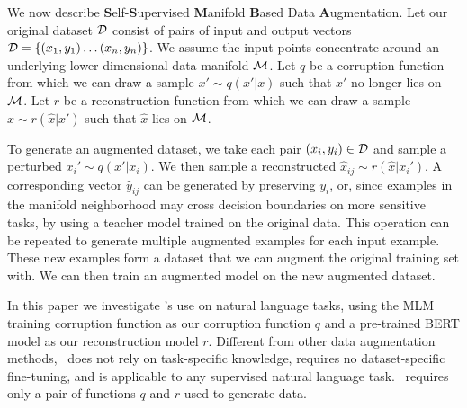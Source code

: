 \noindent We now describe \textbf{S}elf-\textbf{S}upervised \textbf{M}anifold \textbf{B}ased Data \textbf{A}ugmentation. 
Let our original dataset $\mathcal{D}$ consist of pairs of input and output vectors $\mathcal{D} = \{(x_1, y_1)\ldots(x_n, y_n)\}$.
We assume the input points concentrate around an underlying lower dimensional data manifold $\mathcal{M}$.
Let $q$ be a corruption function from which we can draw a sample $x' \sim q(x'|x)$ such that $x'$ no longer lies on $\mathcal{M}$.
Let $r$ be a reconstruction function from which we can draw a sample $\hat{x} \sim r(\hat{x}|x')$ such that $\hat{x}$ lies on $\mathcal{M}$. 

To generate an augmented dataset, we take
each pair $(x_i, y_i)\in\mathcal{D}$ and sample a perturbed $x_i' \sim q(x'|x_i)$.
We then sample a reconstructed $\hat{x}_{ij} \sim r(\hat{x}|x_i')$.
A corresponding vector $\hat{y}_{ij}$ can be generated by preserving $y_i$, or, 
since examples in the manifold neighborhood may cross decision boundaries on more sensitive tasks, by using a teacher model trained on the original data.
This operation can be repeated to generate multiple augmented examples for each input example.
These new examples form a dataset that we can augment the original training set with. 
We can then train an augmented model on the new augmented dataset.

In this paper we investigate \ssmba's use on natural language tasks, using the MLM training corruption function as our corruption function $q$ and a pre-trained BERT model as our reconstruction model $r$.
Different from other data augmentation methods, %
\ssmba\ does not rely on task-specific knowledge, requires no dataset-specific fine-tuning, and is applicable to any supervised natural language task.
\ssmba\ requires only a pair of functions $q$ and $r$ used to generate data.

